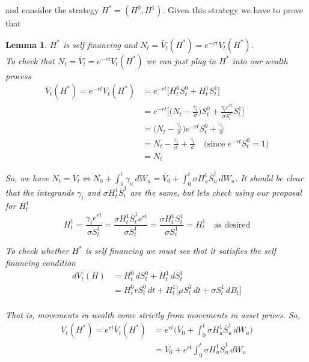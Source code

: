 \documentclass[12pt]{article}
\newtheorem{lemma}{Lemma}
\newlength\tindent
\renewcommand{\indent}{\hspace*{\tindent}}
\begin{document}
and consider the strategy $H^* = (H^0,H^1)$. Given this strategy we have to prove that
\begin{lemma} $H^*$ is self financing and $N_t = \overline{V}_t(H^*) = e^{-rt}V_t(H^*)$. \\

To check that $N_t = \overline{V}_t = e^{-rt}V_t(H^*)$ we can just plug in $H^*$ into our wealth process 
\begin{align*}
	\overline{V}_t(H^*) = e^{-rt}V_t(H^*) &= e^{-rt}\big[H^0_tS^0_t + H^1_tS^1_t\big] \\
	&= e^{-rt}\big[\big(N_t - \frac{\gamma_t}{\sigma}\big)S^0_t + \frac{\gamma_te^{rt}}{\sigma S^1_t}S^1_t\big] \\
	&= \big(N_t - \frac{\gamma_t}{\sigma}\big)e^{-rt}S^0_t + \frac{\gamma_t}{\sigma} \\
	&= N_t - \frac{\gamma_t}{\sigma} + \frac{\gamma_t}{\sigma} \quad \text{(since $e^{-rt}S^0_t = 1$)} \\
	&= N_t
\end{align*}

\indent So, we have $N_t = \overline{V}_t \iff N_0 + \int^t_0\gamma_u\,dW_u = \overline{V}_0 + \int^t_0 \sigma H^1_u\overline{S}^1_u\,dW_u$. It should be clear that the integrands $\gamma_t$ and $\sigma H^1_t\overline{S}^1_t$ are the same, but lets check using our proposal for $H^1_t$
\begin{equation*}
	H^1_t = \frac{\gamma_te^{rt}}{\sigma S^1_t} =  \frac{\sigma H^1_t \overline{S}^1_t e^{rt}}{\sigma S^1_t} =  \frac{\sigma H^1_t S^1_t}{\sigma S^1_t} = H^1_t \quad \text{as desired}
\end{equation*}

To check whether $H^*$ is self financing we must see that it satisfies the self financing condition
\begin{align*}
	dV_t(H) &= H^0_t\,dS^0_t + H^1_t\,dS^1_t \\
	&= H^0_trS^0_t\,dt + H^1_t\big[\mu S^1_t\,dt + \sigma S^1_t\,dB_t\big] \\
\end{align*}

That is, movements in wealth come strictly from movements in asset prices. So,
\begin{align*}
	V_t(H^*) = e^{rt}\overline{V}_t(H^*) &= e^{rt}\big(\overline{V}_0 + \int^t_0\sigma H^1_u\overline{S}^1_u\,dW_u \big) \\
	&= \overline{V_0} + e^{rt}\int^t_0\sigma H^1_u\overline{S}^1_u\,dW_u \\
\end{align*}


\end{lemma}
\end{document}
